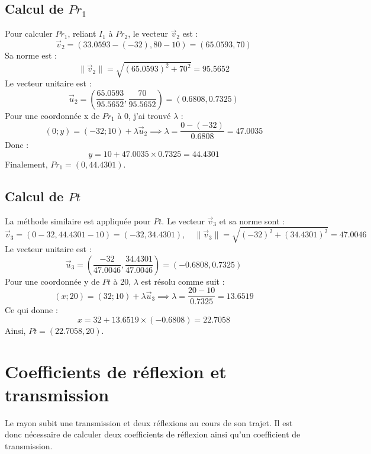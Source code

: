 \subsection*{Calcul de $Pr_1$}
Pour calculer $Pr_1$, reliant $I_1$ à $Pr_2$, le vecteur $\vec{v}_2$ est :
\[
\vec{v}_2 = (33.0593 - (-32), 80 - 10) = (65.0593, 70)
\]
Sa norme est :
\[
\|\vec{v}_2\| = \sqrt{(65.0593)^2 + 70^2} = 95.5652
\]
Le vecteur unitaire est :
\[
\vec{u}_2 = \left(\frac{65.0593}{95.5652}, \frac{70}{95.5652}\right) = (0.6808, 0.7325)
\]
Pour une coordonnée x de $Pr_1$ à 0, j'ai trouvé $\lambda$ :
\[
(0; y) = (-32; 10) + \lambda \vec{u}_2 \implies \lambda = \frac{0 - (-32)}{0.6808} = 47.0035
\]
Donc :
\[
y = 10 + 47.0035 \times 0.7325 = 44.4301
\]
Finalement, $Pr_1 = (0, 44.4301)$.

\subsection*{Calcul de $Pt$}
La méthode similaire est appliquée pour $Pt$. Le vecteur $\vec{v}_3$ et sa norme sont :
\[
\vec{v}_3 = (0 - 32, 44.4301 - 10) = (-32, 34.4301), \quad \|\vec{v}_3\| = \sqrt{(-32)^2 + (34.4301)^2} = 47.0046
\]
Le vecteur unitaire est :
\[
\vec{u}_3 = \left(\frac{-32}{47.0046}, \frac{34.4301}{47.0046}\right) = (-0.6808, 0.7325)
\]
Pour une coordonnée y de $Pt$ à 20, $\lambda$ est résolu comme suit :
\[
(x; 20) = (32; 10) + \lambda \vec{u}_3 \implies \lambda = \frac{20 - 10}{0.7325} = 13.6519
\]
Ce qui donne :
\[
x = 32 + 13.6519 \times (-0.6808) = 22.7058
\]
Ainsi, $Pt = (22.7058, 20)$.

\section*{Coefficients de réflexion et transmission}

Le rayon subit une transmission et deux réflexions au cours de son trajet. Il est donc nécessaire de calculer deux coefficients de réflexion ainsi qu'un coefficient de transmission.

